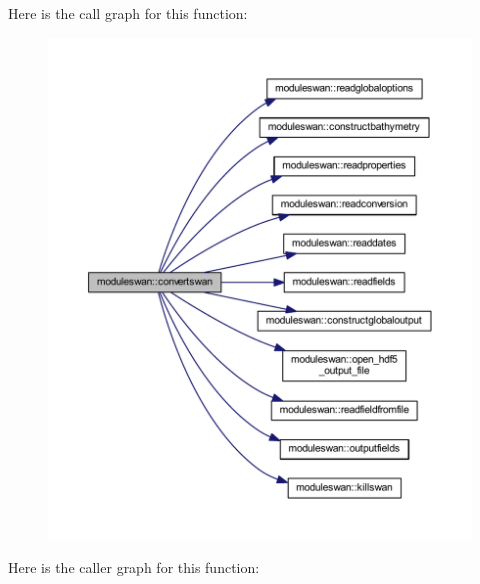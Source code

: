 Here is the call graph for this function\+:\nopagebreak
\begin{figure}[H]
\begin{center}
\leavevmode
\includegraphics[width=350pt]{namespacemoduleswan_aa4916273cc3ac0c249fd48ef574161b3_cgraph}
\end{center}
\end{figure}
Here is the caller graph for this function\+:\nopagebreak
